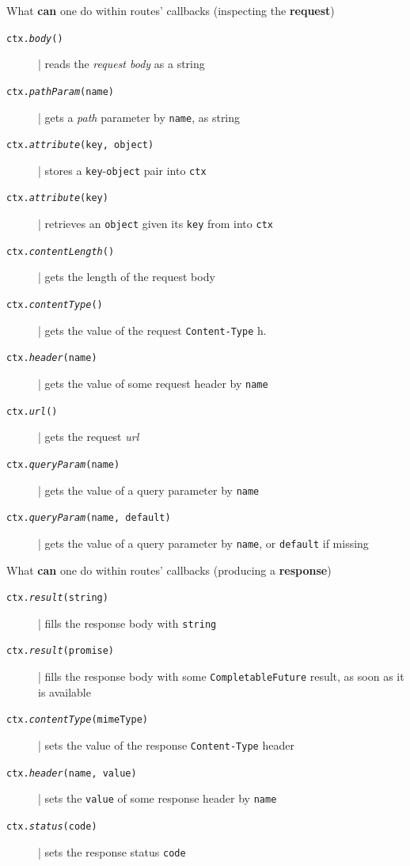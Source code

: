 \documentclass[presentation]{beamer}\mode<presentation>{\usetheme{AMSCesenaPurpleAndGold}}
\begin{document}
\begin{frame}[allowframebreaks]
    \begin{block}{What \textbf{can} one do within routes' callbacks (inspecting the \textbf{request})}
        \begin{description}
            \item[\texttt{ctx.\textit{body}()}] | reads the \emph{request body} as a string 
            \item[\texttt{ctx.\textit{pathParam}(name)}] | gets a \emph{path} parameter by \texttt{name}, as string
            \item[\texttt{ctx.\textit{attribute}(key, object)}] | stores a \texttt{key}-\texttt{object} pair into \texttt{ctx}
            \item[\texttt{ctx.\textit{attribute}(key)}] | retrieves an \texttt{object} given its \texttt{key} from into \texttt{ctx}       
            \item[\texttt{ctx.\textit{contentLength}()}] | gets the length of the request body   
            \item[\texttt{ctx.\textit{contentType}()}] | gets the value of the request \texttt{Content-Type} h.  
            \item[\texttt{ctx.\textit{header}(name)}] | gets the value of some request header by \texttt{name}   
            \item[\texttt{ctx.\textit{url}()}] | gets the request \emph{url}   
            \item[\texttt{ctx.\textit{queryParam}(name)}] | gets the value of a query parameter by \texttt{name}
            \item[\texttt{ctx.\textit{queryParam}(name, default)}] | gets the value of a query parameter by \texttt{name}, or \texttt{default} if missing 
        \end{description}
    \end{block}

    \framebreak

    \begin{block}{What \textbf{can} one do within routes' callbacks (producing a \textbf{response})}
        \begin{description}
            \item[\texttt{ctx.\textit{result}(string)}] | fills the response body with \texttt{string}
            \item[\texttt{ctx.\textit{result}(promise)}] | fills the response body with some \texttt{CompletableFuture} result, as soon as it is available
            \item[\texttt{ctx.\textit{contentType}(mimeType)}] | sets the value of the response \texttt{Content-Type} header  
            \item[\texttt{ctx.\textit{header}(name, value)}] | sets the \texttt{value} of some response header by \texttt{name}
            \item[\texttt{ctx.\textit{status}(code)}] | sets the response status \texttt{code}         
        \end{description}
    \end{block}


\end{frame}
\end{document}
